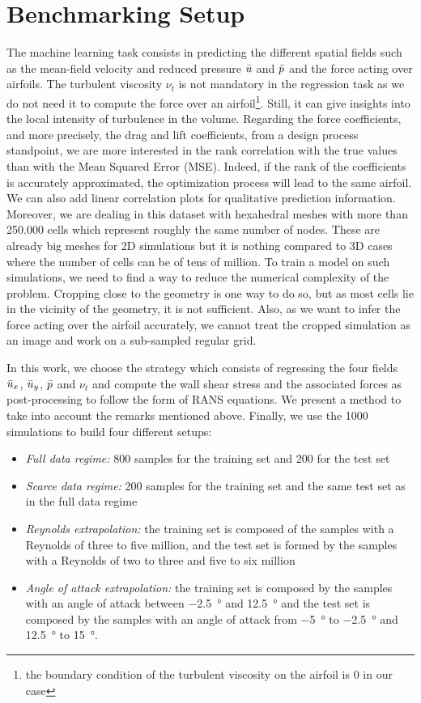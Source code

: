 \section{Benchmarking Setup}\label{sec:setup}
The machine learning task consists in predicting the different spatial fields such as the mean-field velocity and reduced pressure $\Bar{u}$ and $\Bar{p}$ and the force acting over airfoils. The turbulent viscosity $\nu_t$ is not mandatory in the regression task as we do not need it to compute the force over an airfoil\footnote{the boundary condition of the turbulent viscosity on the airfoil is 0 in our case}. Still, it can give insights into the local intensity of turbulence in the volume. Regarding the force coefficients, and more precisely, the drag and lift coefficients, from a design process standpoint, we are more interested in the rank correlation with the true values than with the Mean Squared Error (MSE). Indeed, if the rank of the coefficients is accurately approximated, the optimization process will lead to the same airfoil. We can also add linear correlation plots for qualitative prediction information. Moreover, we are dealing in this dataset with hexahedral meshes with more than \SI{250,000}{} cells which represent roughly the same number of nodes. These are already big meshes for 2D simulations but it is nothing compared to 3D cases where the number of cells can be of tens of million. To train a model on such simulations, we need to find a way to reduce the numerical complexity of the problem. Cropping close to the geometry is one way to do so, but as most cells lie in the vicinity of the geometry, it is not sufficient. Also, as we want to infer the force acting over the airfoil accurately, we cannot treat the cropped simulation as an image and work on a sub-sampled regular grid.

In this work, we choose the strategy which consists of regressing the four fields $\Bar{u}_x$, $\Bar{u}_y$, $\Bar{p}$ and $\nu_t$ and compute the wall shear stress and the associated forces as post-processing to follow the form of RANS equations. We present a method to take into account the remarks mentioned above. Finally, we use the 1000 simulations to build four different setups:
\begin{itemize}
	\item \emph{Full data regime:} 800 samples for the training set and 200 for the test set
	\item \emph{Scarce data regime:} 200 samples for the training set and the same test set as in the full data regime
	\item \emph{Reynolds extrapolation:} the training set is composed of the samples with a Reynolds of three to five million, and the test set is formed by the samples with a Reynolds of two to three and five to six million
	\item \emph{Angle of attack extrapolation:} the training set is composed by the samples with an angle of attack between \SI{-2.5}{\degree} and \SI{12.5}{\degree} and the test set is composed by the samples with an angle of attack from \SI{-5}{\degree} to \SI{-2.5}{\degree} and \SI{12.5}{\degree} to \SI{15}{\degree}.
\end{itemize}

